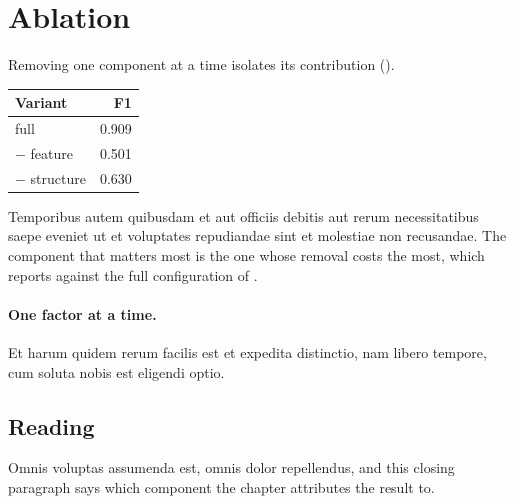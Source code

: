 \section{Ablation}
\label{sec:exp-ablation}

Removing one component at a time isolates its contribution ().

\begin{margintable}
  \centering
  \caption[Ablation in the margin]{One factor at a time, beside the paragraph that reads it.}
  \label{tab:exp-ablation}
  \small
  \begin{tabular}{@{}lr@{}}
    \toprule
    Variant & F1 \\
    \midrule
    full & 0.909 \\
    $-$ feature & 0.501 \\
    $-$ structure & 0.630 \\
    \bottomrule
  \end{tabular}
\end{margintable}

Temporibus autem quibusdam et aut officiis debitis aut rerum necessitatibus saepe eveniet ut et voluptates repudiandae sint et molestiae non recusandae.
The component that matters most is the one whose removal costs the most, which  reports against the full configuration of .

\paragraph{One factor at a time.}
Et harum quidem rerum facilis est et expedita distinctio, nam libero tempore, cum soluta nobis est eligendi optio.

\subsection{Reading}
\label{sec:exp-ablation-reading}

Omnis voluptas assumenda est, omnis dolor repellendus, and this closing paragraph says which component the chapter attributes the result to.
